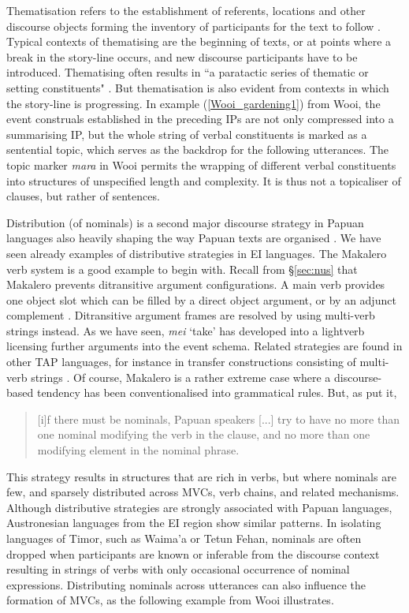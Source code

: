 Thematisation refers to the establishment of referents, locations and other discourse objects forming the inventory of participants for the text to follow \citep{heeschen1998eipo, devries2006areal}. Typical contexts of thematising are the beginning of texts, or at points where a break in the story-line occurs, and new discourse participants have to be introduced. Thematising often results in ``a paratactic series of thematic or setting constituents" \citep[814]{devries2006areal}. But thematisation is also evident from contexts  in which the story-line is progressing. In example (\ref{Wooi_gardening1}) from Wooi, the event construals established in the preceding IPs are not only compressed into a summarising IP, but the whole string of verbal constituents is marked as a sentential topic, which serves as the backdrop for the following utterances. The topic marker \textit{mara} in Wooi permits the wrapping of different verbal constituents into structures of unspecified length and complexity. It is thus not a topicaliser of clauses, but rather of sentences.

Distribution (of nominals) is a second major discourse strategy in Papuan languages also heavily shaping the way Papuan texts are organised \citep{devries2005towards, devries2006areal}. We have seen already examples of distributive strategies in EI languages. The Makalero verb system is a good example to begin with. Recall from §\ref{sec:nus} that Makalero prevents ditransitive argument configurations. A main verb provides one object slot which can be filled by a direct object argument, or by an adjunct complement \citep{huber2011}. Ditransitive argument frames are resolved by using multi-verb strings instead. As we have seen, \textit{mei} `take' has developed into a lightverb licensing further arguments into the event schema. Related strategies are found in other TAP languages, for instance in transfer constructions consisting of multi-verb strings \citep{klamer2012development}. Of course, Makalero is a rather extreme case where a discourse-based tendency has been conventionalised into grammatical rules. But, as \citet[813]{devries2006areal} put it, \begin{quote}[i]f there must be nominals, Papuan speakers [...] try to have no more than one nominal modifying the verb in the clause, and no more than one modifying element in the nominal phrase.\end{quote} This strategy results in structures that are rich in verbs, but where nominals are few, and sparsely distributed across MVCs, verb chains, and related mechanisms. Although distributive strategies are strongly associated with Papuan languages, Austronesian languages from the EI region show similar patterns. In isolating languages of Timor, such as Waima'a or Tetun Fehan, nominals are often dropped when participants are known or inferable from the discourse context resulting in strings of verbs with only occasional occurrence of nominal expressions. Distributing nominals across utterances can also influence the formation of MVCs, as the following example from Wooi illustrates.

